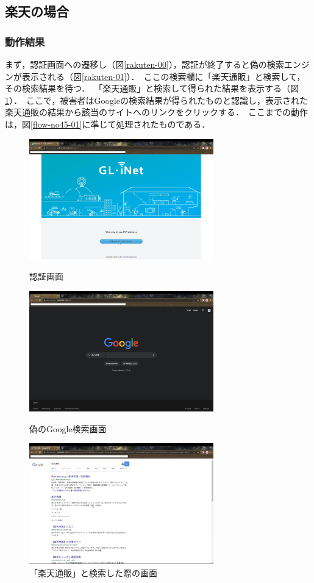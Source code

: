 \documentclass[dvipdfmx,twocolumn]{jsarticle}
\begin{document}
        \subsection{楽天の場合}
            \subsubsection{動作結果}
                まず，認証画面への遷移し（図\ref{rakuten-00}），認証が終了すると偽の検索エンジンが表示される（図\ref{rakuten-01}）．\
                ここの検索欄に「楽天通販」と検索して，その検索結果を待つ．\
                「楽天通販」と検索して得られた結果を表示する（図\ref{rakuten-02}）．\
                ここで，被害者はGoogleの検索結果が得られたものと認識し，表示された楽天通販の結果から該当のサイトへのリンクをクリックする．\
                ここまでの動作は，図\ref{flow-no45-01}に準じて処理されたものである．\
                \begin{figure}[h]
                    \centering
                    \includegraphics[width=8cm]{img/rakuten/rakuten-00.png}
                    \caption{認証画面}
                    \label{rakuten-00}
                    \includegraphics[width=8cm]{img/rakuten/rakuten-01.png}
                    \caption{偽のGoogle検索画面}
                    \label{rakuten-01}
                    \includegraphics[width=8cm]{img/rakuten/rakuten-02.png}
                    \caption{「楽天通販」と検索した際の画面}
                    \label{rakuten-02}
                \end{figure}
\end{document}
